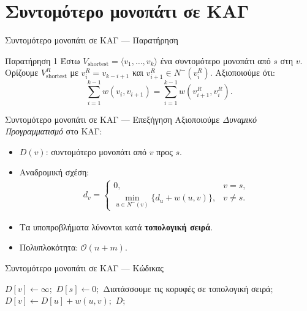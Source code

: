 \documentclass{beamer}
\makeatletter
\newenvironment{yellowalgo}{
    \begin{tcolorbox}[colback=myyellow, colframe=myyellow, boxrule=0.5pt]
    \begin{algorithmic}[1]
    \setcounter{ALG@line}{-1}
}{
    \end{algorithmic}
    \end{tcolorbox}
}
\makeatother
\begin{document}
\section{Συντομότερο μονοπάτι σε ΚΑΓ}

\begin{frame}{Συντομότερο μονοπάτι σε ΚΑΓ --- Παρατήρηση}
\begin{block}{Παρατήρηση 1}
Έστω $V_{\text{shortest}} = \langle v_1,\dots,v_k\rangle$ ένα συντομότερο μονοπάτι από $s$ στη $v$.
Ορίζουμε $V^R_{\text{shortest}}$ με $v^R_i = v_{k-i+1}$ και $v^R_{i+1}\in N^-(v^R_i)$.
Αξιοποιούμε ότι:
\begin{equation*}
    \sum_{i=1}^{k-1} w(v_i,v_{i+1}) = \sum_{i=1}^{k-1} w(v^R_{i+1}, v^R_i).
\end{equation*}
\end{block}
\end{frame}

\begin{frame}{Συντομότερο μονοπάτι σε ΚΑΓ --- Επεξήγηση}
Αξιοποιούμε \emph{Δυναμικό Προγραμματισμό} στο ΚΑΓ:
\begin{itemize}
    \item $D(v)$: συντομότερο μονοπάτι από $v$ προς $s$.
    \item Αναδρομική σχέση:
    \begin{align*}
        d_v =
        \begin{cases}
            0, & v = s, \\
            \min_{u \in N^-(v)}\{d_u + w(u,v)\}, & v \neq s.
        \end{cases}
    \end{align*}
    \item Τα υποπροβλήματα λύνονται κατά \textbf{τοπολογική σειρά}.
    \item Πολυπλοκότητα: $\mathcal{O}(n + m)$.
\end{itemize}
\end{frame}

\begin{frame}{Συντομότερο μονοπάτι σε ΚΑΓ --- Κώδικας}
\begin{yellowalgo}
            \State $D[v] \gets \infty;$
        \EndFor
        \State $D[s] \gets 0;$
        \State Διατάσσουμε τις κορυφές σε τοπολογική σειρά$;$
                    \State $D[v] \gets D[u] + w(u, v);$
                \EndIf
            \EndFor
        \EndFor
        \State \Return $D;$
    \EndFunction
\end{yellowalgo}
\end{frame}
\end{document}
